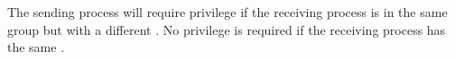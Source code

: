 \begin{appendix}
\begin{manroutinedescription}
      The sending process will require {} privilege if the
      receiving process is in the same group but with a different {}.
      No privilege is required if the receiving process has the same {}.

\end{manroutinedescription}

%



\end{appendix}

